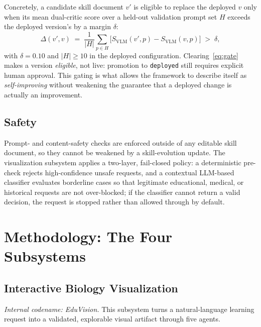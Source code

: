 \documentclass[conference]{IEEEtran}
\begin{document}
Concretely, a candidate skill document $v'$ is eligible to replace the deployed $v$ only when its mean dual-critic score over a held-out validation prompt set $H$ exceeds the deployed version's by a margin $\delta$:
\begin{equation}
\label{eq:gate}
\Delta(v', v) \;=\; \frac{1}{|H|}\sum_{p \in H}\bigl[S_{\mathrm{VLM}}(v', p) - S_{\mathrm{VLM}}(v, p)\bigr] \;>\; \delta ,
\end{equation}
with $\delta = 0.10$ and $|H| \geq 10$ in the deployed configuration. Clearing~\eqref{eq:gate} makes a version \emph{eligible}, not live: promotion to \texttt{deployed} still requires explicit human approval. This gating is what allows the framework to describe itself as \emph{self-improving} without weakening the guarantee that a deployed change is actually an improvement.

\subsection{Safety}

Prompt- and content-safety checks are enforced outside of any editable skill document, so they cannot be weakened by a skill-evolution update. The visualization subsystem applies a two-layer, fail-closed policy: a deterministic pre-check rejects high-confidence unsafe requests, and a contextual LLM-based classifier evaluates borderline cases so that legitimate educational, medical, or historical requests are not over-blocked; if the classifier cannot return a valid decision, the request is stopped rather than allowed through by default.

\section{Methodology: The Four Subsystems}
\label{sec:methods}

\subsection{Interactive Biology Visualization}
\label{sec:viz}

\emph{Internal codename: EduVision.} This subsystem turns a natural-language learning request into a validated, explorable visual artifact through five agents.
\end{document}

